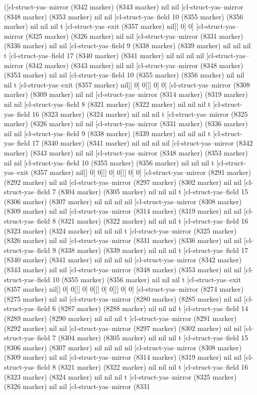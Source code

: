 {{([cl-struct-yas--mirror (8342 marker) (8343 marker) nil nil [cl-struct-yas--mirror (8348 marker) (8353 marker) nil nil [cl-struct-yas--field 10 (8355 marker) (8356 marker) nil nil nil t [cl-struct-yas--exit (8357 marker) nil]] 0] 0] [cl-struct-yas--mirror (8325 marker) (8326 marker) nil nil [cl-struct-yas--mirror (8331 marker) (8336 marker) nil nil [cl-struct-yas--field 9 (8338 marker) (8339 marker) nil nil nil t [cl-struct-yas--field 17 (8340 marker) (8341 marker) nil nil nil nil [cl-struct-yas--mirror (8342 marker) (8343 marker) nil nil [cl-struct-yas--mirror (8348 marker) (8353 marker) nil nil [cl-struct-yas--field 10 (8355 marker) (8356 marker) nil nil nil t [cl-struct-yas--exit (8357 marker) nil]] 0] 0]]] 0] 0] [cl-struct-yas--mirror (8308 marker) (8309 marker) nil nil [cl-struct-yas--mirror (8314 marker) (8319 marker) nil nil [cl-struct-yas--field 8 (8321 marker) (8322 marker) nil nil nil t [cl-struct-yas--field 16 (8323 marker) (8324 marker) nil nil nil t [cl-struct-yas--mirror (8325 marker) (8326 marker) nil nil [cl-struct-yas--mirror (8331 marker) (8336 marker) nil nil [cl-struct-yas--field 9 (8338 marker) (8339 marker) nil nil nil t [cl-struct-yas--field 17 (8340 marker) (8341 marker) nil nil nil nil [cl-struct-yas--mirror (8342 marker) (8343 marker) nil nil [cl-struct-yas--mirror (8348 marker) (8353 marker) nil nil [cl-struct-yas--field 10 (8355 marker) (8356 marker) nil nil nil t [cl-struct-yas--exit (8357 marker) nil]] 0] 0]]] 0] 0]]] 0] 0] [cl-struct-yas--mirror (8291 marker) (8292 marker) nil nil [cl-struct-yas--mirror (8297 marker) (8302 marker) nil nil [cl-struct-yas--field 7 (8304 marker) (8305 marker) nil nil nil t [cl-struct-yas--field 15 (8306 marker) (8307 marker) nil nil nil nil [cl-struct-yas--mirror (8308 marker) (8309 marker) nil nil [cl-struct-yas--mirror (8314 marker) (8319 marker) nil nil [cl-struct-yas--field 8 (8321 marker) (8322 marker) nil nil nil t [cl-struct-yas--field 16 (8323 marker) (8324 marker) nil nil nil t [cl-struct-yas--mirror (8325 marker) (8326 marker) nil nil [cl-struct-yas--mirror (8331 marker) (8336 marker) nil nil [cl-struct-yas--field 9 (8338 marker) (8339 marker) nil nil nil t [cl-struct-yas--field 17 (8340 marker) (8341 marker) nil nil nil nil [cl-struct-yas--mirror (8342 marker) (8343 marker) nil nil [cl-struct-yas--mirror (8348 marker) (8353 marker) nil nil [cl-struct-yas--field 10 (8355 marker) (8356 marker) nil nil nil t [cl-struct-yas--exit (8357 marker) nil]] 0] 0]]] 0] 0]]] 0] 0]]] 0] 0] [cl-struct-yas--mirror (8274 marker) (8275 marker) nil nil [cl-struct-yas--mirror (8280 marker) (8285 marker) nil nil [cl-struct-yas--field 6 (8287 marker) (8288 marker) nil nil nil t [cl-struct-yas--field 14 (8289 marker) (8290 marker) nil nil nil t [cl-struct-yas--mirror (8291 marker) (8292 marker) nil nil [cl-struct-yas--mirror (8297 marker) (8302 marker) nil nil [cl-struct-yas--field 7 (8304 marker) (8305 marker) nil nil nil t [cl-struct-yas--field 15 (8306 marker) (8307 marker) nil nil nil nil [cl-struct-yas--mirror (8308 marker) (8309 marker) nil nil [cl-struct-yas--mirror (8314 marker) (8319 marker) nil nil [cl-struct-yas--field 8 (8321 marker) (8322 marker) nil nil nil t [cl-struct-yas--field 16 (8323 marker) (8324 marker) nil nil nil t [cl-struct-yas--mirror (8325 marker) (8326 marker) nil nil [cl-struct-yas--mirror (8331 }}

